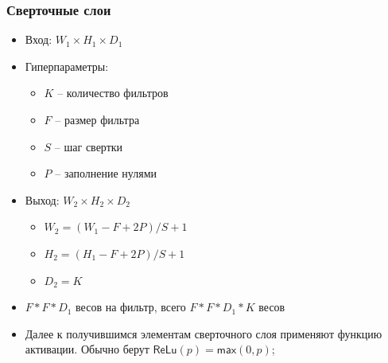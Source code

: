 \documentclass[unicode,9pt, pdf]{beamer}
\begin{document}
\begin{frame}
	\frametitle{Сверточные слои}
	\begin{center}
		\begin{itemize}
			\item Вход: $W_{1} \times H_{1} \times D_{1}$
			\item Гиперпараметры:
				\begin{itemize}
			 		\item $K$ -- количество фильтров
			 		\item $F$ -- размер фильтра 
			 		\item $S$ -- шаг свертки
			 		\item $P$ -- заполнение нулями
				\end{itemize}
			\item Выход: $W_{2} \times H_{2} \times D_{2}$
				\begin{itemize}
					\item $W_{2}  = (W_{1} - F + 2P)/S + 1$
					\item $H_{2}  = (H_{1} - F + 2P)/S + 1$
					\item  $D_{2} = K$
				\end{itemize}
			\item $F*F*D_{1}$ весов на фильтр, всего $F*F*D_{1}*K$ весов
			\item Далее к получившимся элементам сверточного слоя применяют функцию активации. Обычно берут $\mathsf{ReLu}(p) = \mathsf{max}(0,p)$;
		\end{itemize}
	\end{center}
\end{frame}
	
\end{document}

